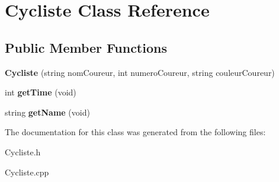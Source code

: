\hypertarget{classCycliste}{}\section{Cycliste Class Reference}
\label{classCycliste}
\subsection*{Public Member Functions}
\begin{DoxyCompactItemize}
\item 
\mbox{\label{classCycliste_a0421a2d9e97b973bc73ee69668a73c0a}} 
{\bfseries Cycliste} (string nom\+Coureur, int numero\+Coureur, string couleur\+Coureur)
\item 
\mbox{\label{classCycliste_a9cef69b7cb1050fea25da277eea06940}} 
int {\bfseries get\+Time} (void)
\item 
\mbox{\label{classCycliste_a0c46061d327f2c76830904fb83a370a5}} 
string {\bfseries get\+Name} (void)
\end{DoxyCompactItemize}


The documentation for this class was generated from the following files\+:\begin{DoxyCompactItemize}
\item 
Cycliste.\+h\item 
Cycliste.\+cpp\end{DoxyCompactItemize}
